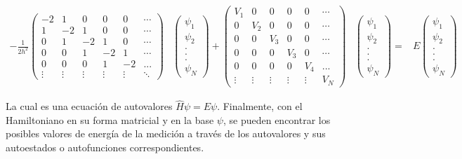 \documentclass[a4paper]{article}
\theoremstyle{definition}
\theoremstyle{plain}
\begin{document}
\begin{align*}
    -\frac{1}{2h^2}
    \begin{pmatrix}
        -2 & 1 & 0 & 0 & 0 & \cdots\\ 
        1 & -2 & 1 & 0 & 0 & \cdots\\ 
        0 & 1 & -2 & 1 & 0 & \cdots\\ 
        0 & 0 & 1 & -2 & 1 & \cdots \\ 
        0 & 0 & 0 & 1& -2 & ...\\ 
        \vdots & \vdots & \vdots & \vdots & \vdots & \ddots  
    \end{pmatrix} &
    \begin{pmatrix}
        \psi_1\\ 
        \psi_2\\ 
        . \\ 
        .  \\ 
        . \\ 
        \psi_N 
    \end{pmatrix}+ 
    \begin{pmatrix}
        V_1 & 0 & 0 & 0 & 0 & \cdots\\ 
        0 & V_2 & 0 & 0 & 0 & \cdots\\ 
        0 & 0 & V_3 & 0 & 0 & \cdots\\ 
        0 & 0 & 0 & V_3 & 0 & \cdots \\ 
        0 & 0 & 0 & 0& V_4 & ...\\ 
        \vdots & \vdots & \vdots & \vdots & \vdots & V_N 
    \end{pmatrix} &
    \begin{pmatrix}
        \psi_1\\ 
        \psi_2\\ 
        . \\ 
        .  \\ 
        . \\ 
        \psi_N 
    \end{pmatrix} =& E
    \begin{pmatrix}
        \psi_1\\ 
        \psi_2\\ 
        . \\ 
        .  \\ 
        . \\ 
        \psi_N 
    \end{pmatrix} 
\end{align*}

La cual es una ecuación de autovalores $\hat H \psi = E \psi$. Finalmente, con el Hamiltoniano en su forma matricial y en la base $\psi$, se pueden encontrar los posibles valores de energía de la medición a través de los autovalores y sus autoestados o autofunciones correspondientes.
\end{document}

